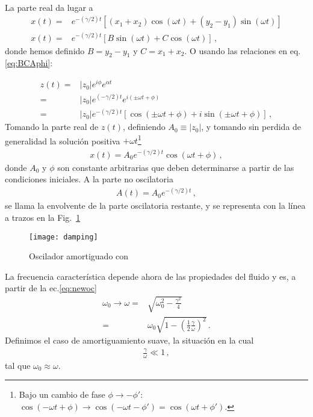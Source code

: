 \begin{frame}
\begin{borrar}
La parte real da lugar a
\begin{align*}
  x(t)=&e^{-(\gamma/2) t}\left[(x_1+x_2)\cos(\omega t)+(y_2-y_1)\sin(\omega t)\right]\nonumber\\
  x(t)=&e^{-(\gamma/2) t}\left[B\sin(\omega t)+C\cos(\omega t)\right]\,,
\end{align*}
donde hemos definido $B=y_2-y_1$ y $C=x_1+x_2$. O usando las relaciones en eq.\eqref{eq:BCAphi}:  
\end{borrar}
\begin{align*}
  z(t)=&|z_0|e^{i\phi} e^{\alpha t}\nonumber\\
  =&|z_0|e^{(-\gamma/2)t}e^{i(\pm \omega t+\phi)}\nonumber\\
  =&|z_0|e^{-(\gamma/2)t}[\cos(\pm \omega t+\phi)+i\sin(\pm \omega t+\phi)]\,,
\end{align*}
Tomando la parte real de $z(t)$, definiendo $A_0\equiv |z_0|$, y tomando sin perdida de generalidad la solución positiva $+\omega t$\footnote{Bajo un cambio de fase $\phi\to-\phi'$: $\cos(-\omega t+\phi)\to \cos(-\omega t-\phi')=\cos(\omega t+\phi')$.}
\begin{align}
  \label{eq:soluflui}
  x(t)=A_0 e^{-(\gamma/2)t}\cos(\omega t+\phi)\,,
\end{align}
donde $A_0$ y $\phi$ son constante arbitrarias que deben determinarse a partir de las condiciones iniciales. A la parte no oscilatoria
\begin{align*}
  A(t)=A_0 e^{-(\gamma/2)t}\,,
\end{align*}
se llama la envolvente de la parte oscilatoria restante, y se representa con la línea a trazos en la Fig.~\ref{fig:damping}
\end{frame}
\begin{frame}
\begin{figure}
  \centering
  \texttt{[image: damping]}
  \caption{Oscilador amortiguado con }
  \label{fig:damping}
\end{figure}
\end{frame}
La frecuencia característica  depende ahora de las propiedades del fluido y es, a partir de  la ec.\eqref{eq:newoc}
\begin{align*}
  \omega_0\to \omega=&\sqrt{\omega_0^2-\frac{\gamma^2}{4}}\nonumber\\
=&\omega_0\sqrt{1-\left(\frac{1}{2}\frac{\gamma}{\omega}\right)^2}\,.
\end{align*}
Definimos el caso de amortiguamiento suave, la situación en la cual
\begin{align}
  \label{eq:SoftDamping}
  \frac{\gamma}{\omega}\ll 1\,,
\end{align}
tal que $\omega_0\approx\omega$. 

